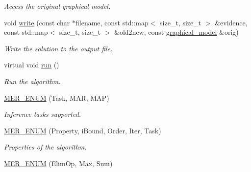 \begin{DoxyCompactItemize}
\begin{DoxyCompactList}\small\item\em Access the original graphical model. \end{DoxyCompactList}\item 
void \hyperlink{classmerlin_1_1ijgp_a354f839e86b17daef20a9d02e37bee15}{write} (const char $\ast$filename, const std\+::map$<$ size\+\_\+t, size\+\_\+t $>$ \&evidence, const std\+::map$<$ size\+\_\+t, size\+\_\+t $>$ \&old2new, const \hyperlink{classmerlin_1_1graphical__model}{graphical\+\_\+model} \&orig)
\begin{DoxyCompactList}\small\item\em Write the solution to the output file. \end{DoxyCompactList}\item 
virtual void \hyperlink{classmerlin_1_1ijgp_ac255c416a80f2bddab2855e5f66df8bd}{run} ()
\begin{DoxyCompactList}\small\item\em Run the algorithm. \end{DoxyCompactList}\item 
\hypertarget{classmerlin_1_1ijgp_a084ab747630d8c362172cd45594feada}{}\hyperlink{classmerlin_1_1ijgp_a084ab747630d8c362172cd45594feada}{M\+E\+R\+\_\+\+E\+N\+U\+M} (Task, M\+A\+R, M\+A\+P)\label{classmerlin_1_1ijgp_a084ab747630d8c362172cd45594feada}

\begin{DoxyCompactList}\small\item\em Inference tasks supported. \end{DoxyCompactList}\item 
\hypertarget{classmerlin_1_1ijgp_a559a6a8756e61fcefbcf1bbe744a5924}{}\hyperlink{classmerlin_1_1ijgp_a559a6a8756e61fcefbcf1bbe744a5924}{M\+E\+R\+\_\+\+E\+N\+U\+M} (Property, i\+Bound, Order, Iter, Task)\label{classmerlin_1_1ijgp_a559a6a8756e61fcefbcf1bbe744a5924}

\begin{DoxyCompactList}\small\item\em Properties of the algorithm. \end{DoxyCompactList}\item 
\hypertarget{classmerlin_1_1ijgp_a185c745e26dbe2061d6d47631907098c}{}\hyperlink{classmerlin_1_1ijgp_a185c745e26dbe2061d6d47631907098c}{M\+E\+R\+\_\+\+E\+N\+U\+M} (Elim\+Op, Max, Sum)\label{classmerlin_1_1ijgp_a185c745e26dbe2061d6d47631907098c}


\end{DoxyCompactItemize}
